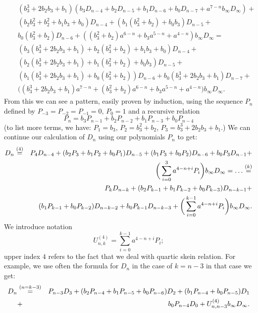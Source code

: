 \documentclass[12pt]{amsart}
\begin{document}
\begin{eqnarray*}
&&(b_3^3+2b_2b_3+b_1)(b_3D_{n-4}+b_2D_{n-5}+b_1D_{n-6}+b_0D_{n-7}+a^{7-n}b_{\infty}D_{\infty})+\\
&&(b_2b_3^2+b_2^2+b_1b_3+b_0)D_{n-4}+(b_1(b_3^2+b_2)+b_0b_3)D_{n-5}+\\
&&b_0(b_3^2+b_2)D_{n-6}+ ((b_3^2+b_2)a^{6-n}+b_3a^{5-n}+a^{4-n})b_{\infty}D_{\infty}=\\
&&(b_3(b_3^3+2b_2b_3+b_1)+b_2(b_3^2+b_2)+b_1b_3+b_0)D_{n-4}+\\
&&(b_2(b_3^3+2b_2b_3+b_1)+b_1(b_3^2+b_2)+b_0b_3)D_{n-5}+\\
&&(b_1(b_3^3+2b_2b_3+b_1)+b_0(b_3^2+b_2))D_{n-6}+b_0(b_3^3+2b_2b_3+b_1)D_{n-7}+\\
&&\bigg((b_3^3+2b_2b_3+b_1)a^{7-n}+ (b_3^2+b_2)a^{6-n}+b_3a^{5-n}+a^{4-n}\bigg)b_{\infty}D_{\infty}.
\end{eqnarray*}
From this we can see a pattern, easily proven by induction, using the sequence $P_n$ defined by 
$P_{-3} = P_{-2} = P_{-1} = 0,\,P_0 = 1$ and a recursive relation
\begin{equation*}
P_n=b_3P_{n-1}+b_2P_{n-2}+b_1P_{n-3}+b_0P_{n-4}
\end{equation*}
(to list more terms, we have: $P_1=b_3$, $P_2=b_3^2+b_2$, $P_3=b_3^3+2b_2b_3+b_1$.) 
We can continue our calculation of $D_n$ using our polynomials $P_n$ to get:
\begin{eqnarray}
\label{4nk-formula}
D_n &\stackrel{(4)}{=}& P_4D_{n-4} + (b_2P_3+b_1P_2+b_0P_1)D_{n-5}+(b_1P_3+b_0P_2)D_{n-6}+b_0P_3D_{n-1}+\\ \notag
&&\bigg(\sum_{i=0}^3 a^{4-n+i}P_i\bigg)b_\infty D_\infty =\ldots \stackrel{(k)}{=}\\ \notag
&&P_kD_{n-k} +(b_2P_{k-1}+b_1P_{k-2}+b_0P_{k-3})D_{n-k-1}+\\ \notag
&&(b_1P_{k-1}+b_0P_{k-2})D_{n-k-2} + b_0P_{k-1}D_{n-k-3}+\bigg(\sum_{i=0}^{k-1} a^{4-n+i}P_i\bigg)b_\infty D_\infty.
 \end{eqnarray}
We introduce notation 
\begin{equation*}
U^{(4)}_{n,k}=\sum_{i=0}^{k-1} a^{4-n+i}P_i;
\end{equation*}
upper index $4$  refers to the fact that we deal with quartic skein relation. For example, we use often the formula for $D_n$ in the case of $k=n-3$ in that case we get:
\begin{eqnarray}
\label{DnD1D0}
D_n&\stackrel{(n=k-3)}{=}&
P_{n-3}D_3+ (b_2P_{n-4}+b_1P_{n-5}+b_0P_{n-6})D_2 +  (b_1P_{n-4}+b_0P_{n-5})D_1 \\ \notag
&+&b_0P_{n-4}D_{0} +U^{(4)}_{n,n-3}b_{\infty}D_{\infty}.
\end{eqnarray}
\end{document}
